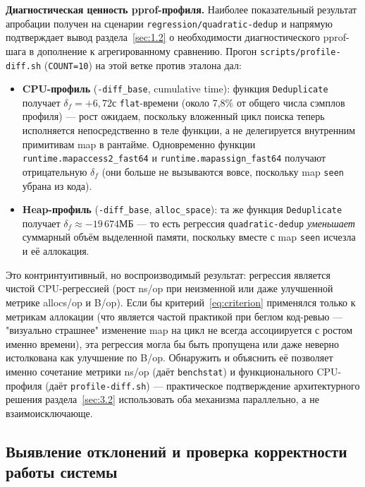 \documentclass[12pt,a4paper]{article}
\numberwithin{equation}{section}
\begin{document}
\textbf{Диагностическая ценность pprof-профиля.} Наиболее показательный
результат апробации получен на сценарии \texttt{regression/\allowbreak quadratic-dedup}
и напрямую подтверждает вывод раздела~\ref{sec:1.2} о необходимости
диагностического pprof-шага в дополнение к агрегированному сравнению.
Прогон \texttt{scripts/\allowbreak profile-diff.sh} (\texttt{COUNT=10}) на этой ветке
против эталона дал:

\begin{itemize}
\item \textbf{CPU-профиль} (\texttt{-diff\_base}, cumulative time):
функция \texttt{Deduplicate} получает $\delta_f = {+6{,}72}$с
\texttt{flat}-времени (около 7,8\% от общего числа сэмплов профиля) — рост
ожидаем, поскольку вложенный цикл поиска теперь исполняется непосредственно
в теле функции, а не делегируется внутренним примитивам map в рантайме.
Одновременно функции \texttt{runtime.mapaccess2\_fast64} и
\texttt{runtime.mapassign\_fast64} получают отрицательную $\delta_f$
(они больше не вызываются вовсе, поскольку map \texttt{seen} убрана из
кода).
\item \textbf{Heap-профиль} (\texttt{-diff\_base}, \texttt{alloc\_space}):
та же функция \texttt{Deduplicate} получает $\delta_f \approx
{-19\,674}$МБ — то есть регрессия \texttt{quadratic-dedup}
\emph{уменьшает} суммарный объём выделенной памяти, поскольку вместе с
map \texttt{seen} исчезла и её аллокация.
\end{itemize}

Это контринтуитивный, но воспроизводимый результат: регрессия является
чистой CPU-регрессией (рост ns/op при неизменной или даже улучшенной
метрике allocs/op и B/op). Если бы критерий~\eqref{eq:criterion}
применялся только к метрикам аллокации (что является частой практикой при
беглом код-ревью — "визуально страшнее" изменение map на цикл не всегда
ассоциируется с ростом именно времени), эта регрессия могла бы быть
пропущена или даже неверно истолкована как улучшение по B/op. Обнаружить
и объяснить её позволяет именно сочетание метрики ns/op (даёт
\texttt{benchstat}) и функционального CPU-профиля (даёт
\texttt{profile-diff.sh}) — практическое подтверждение архитектурного
решения раздела~\ref{sec:3.2} использовать оба механизма параллельно, а не
взаимоисключающе.

\subsection{Выявление отклонений и проверка корректности работы системы}
\label{sec:5.2}
\end{document}
